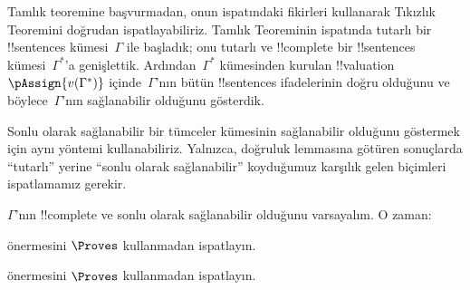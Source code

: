 \documentclass[../../../include/open-logic-section]{subfiles}
\begin{document}
      {}
      {}


Tamlık teoremine başvurmadan, onun ispatındaki fikirleri kullanarak
Tıkızlık Teoremini doğrudan ispatlayabiliriz. Tamlık Teoreminin
ispatında tutarlı bir !!{sentence}s kümesi~$\Gamma$ ile başladık; onu
tutarlı ve !!{complete} bir
!!{sentence}s kümesi~$\Gamma^*$'a genişlettik. Ardından~$\Gamma^*$
kümesinden kurulan 
{!!{valuation}~$\pAssign{v(\Gamma^*)}$} içinde~$\Gamma$'nın bütün
!!{sentence}s ifadelerinin doğru olduğunu ve böylece~$\Gamma$'nın
sağlanabilir olduğunu gösterdik.

Sonlu olarak sağlanabilir bir tümceler kümesinin sağlanabilir olduğunu
göstermek için aynı yöntemi kullanabiliriz. Yalnızca, doğruluk lemmasına
götüren sonuçlarda ``tutarlı'' yerine ``sonlu olarak sağlanabilir''
koyduğumuz karşılık gelen biçimleri ispatlamamız gerekir.

\begin{prop}
$\Gamma$'nın !!{complete} ve sonlu olarak sağlanabilir olduğunu
varsayalım. O zaman:
\begin{enumerate}
\end{enumerate}
\end{prop}

\begin{prob}
 önermesini $\Proves$ kullanmadan
ispatlayın.
\end{prob}
\tagendprob

\begin{prob}
 önermesini $\Proves$ kullanmadan
ispatlayın.
\end{prob}
\tagendprob

\end{document}
